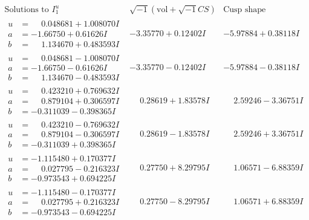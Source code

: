 \documentclass[1p]{elsarticle_modified}
\theoremstyle{definition}
\newcommand{\I}{\sqrt{-1}}
\begin{document}
$$\begin{array}{c|c|c}  
\text{Solutions to }I^u_{1}& \I (\text{vol} + \sqrt{-1}CS) & \text{Cusp shape}\\
 \hline 
\begin{aligned}
u &= \phantom{-}0.048681 + 1.008070 I \\
a &= -1.66750 + 0.61626 I \\
b &= \phantom{-}1.134670 + 0.483593 I\end{aligned}
 & -3.35770 + 0.12402 I & -5.97884 + 0.38118 I \\ \hline\begin{aligned}
u &= \phantom{-}0.048681 - 1.008070 I \\
a &= -1.66750 - 0.61626 I \\
b &= \phantom{-}1.134670 - 0.483593 I\end{aligned}
 & -3.35770 - 0.12402 I & -5.97884 - 0.38118 I \\ \hline\begin{aligned}
u &= \phantom{-}0.423210 + 0.769632 I \\
a &= \phantom{-}0.879104 + 0.306597 I \\
b &= -0.311039 - 0.398365 I\end{aligned}
 & \phantom{-}0.28619 + 1.83578 I & \phantom{-}2.59246 - 3.36751 I \\ \hline\begin{aligned}
u &= \phantom{-}0.423210 - 0.769632 I \\
a &= \phantom{-}0.879104 - 0.306597 I \\
b &= -0.311039 + 0.398365 I\end{aligned}
 & \phantom{-}0.28619 - 1.83578 I & \phantom{-}2.59246 + 3.36751 I \\ \hline\begin{aligned}
u &= -1.115480 + 0.170377 I \\
a &= \phantom{-}0.027795 - 0.216323 I \\
b &= -0.973543 + 0.694225 I\end{aligned}
 & \phantom{-}0.27750 + 8.29795 I & \phantom{-}1.06571 - 6.88359 I \\ \hline\begin{aligned}
u &= -1.115480 - 0.170377 I \\
a &= \phantom{-}0.027795 + 0.216323 I \\
b &= -0.973543 - 0.694225 I\end{aligned}
 & \phantom{-}0.27750 - 8.29795 I & \phantom{-}1.06571 + 6.88359 I \\ \hline\begin{aligned}

\end{aligned}
\end{array}$$
\end{document}
